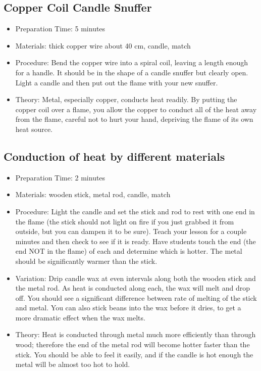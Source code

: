 \subsection{Copper Coil Candle Snuffer}
\begin{itemize}
\item{Preparation Time: 5 minutes}
\item{Materials: thick copper wire about 40 cm, candle, match}
\item{Procedure: Bend the copper wire into a spiral coil, leaving a length enough for a handle. It should be in the shape of a candle snuffer but clearly open. Light a candle and then put out the flame with your new snuffer.}
\item{Theory: Metal, especially copper, conducts heat readily. By putting the copper coil over a flame, you allow the copper to conduct all of the heat away from the flame, careful not to hurt your hand, depriving the flame of its own heat source.}
\end{itemize}

\subsection{Conduction of heat by different materials}
\begin{itemize}
\item{Preparation Time: 2 minutes}
\item{Materials: wooden stick, metal rod, candle, match}
\item{Procedure: Light the candle and set the stick and rod to rest with one end in the flame (the stick should not light on fire if you just grabbed it from outside, but you can dampen it to be sure). Teach your lesson for a couple minutes and then check to see if it is ready. Have students touch the end (the end NOT in the flame) of each and determine which is hotter. The metal should be significantly warmer than the stick.}
\item{Variation: Drip candle wax at even intervals along both the wooden stick and the metal rod. As heat is conducted along each, the wax will melt and drop off. You should see a significant difference between rate of melting of the stick and metal. You can also stick beans into the wax before it dries, to get a more dramatic effect when the wax melts.}
\item{Theory: Heat is conducted through metal much more efficiently than through wood; therefore the end of the metal rod will become hotter faster than the stick. You should be able to feel it easily, and if the candle is hot enough the metal will be almost too hot to hold.}
\end{itemize}

